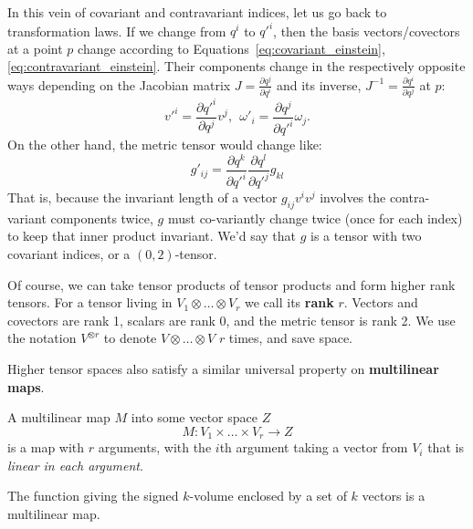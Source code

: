 \documentclass[../master.tex]{subfiles}
\begin{document}
	In this vein of covariant and contravariant indices, let us go back to transformation laws. If we change from $q^i$ to $q'^i$, then the basis vectors/covectors at a point $p$ change according to Equations~\eqref{eq:covariant_einstein},\eqref{eq:contravariant_einstein}. Their components change in the respectively opposite ways depending on the Jacobian matrix $J = \frac{\partial q^j}{\partial q^i}$ and its inverse, $J^{-1} = \frac{\partial q^i}{\partial q^j}$ at $p$:
	\begin{equation}
		v'^i = \frac{\partial q'^i}{\partial q^j} v^j, ~~ \omega'_i = \frac{\partial q^j}{\partial q'^i} \omega_j.
	\end{equation}
	On the other hand, the metric tensor would change like:
	\begin{equation}
		g'_{ij} = \frac{\partial q^k}{\partial q'^i} \frac{\partial q^l}{\partial q'^j} g_{kl}
	\end{equation}
	That is, because the invariant length of a vector $g_{ij} v^i v^j$ involves the contra-variant components twice, $g$ must co-variantly change twice (once for each index) to keep that inner product invariant. We'd say that $g$ is a tensor with two covariant indices, or a $(0,2)$-tensor. 
	
	Of course, we can take tensor products of tensor products and form higher rank tensors. For a tensor living in $V_1 \otimes \dots \otimes V_r$ we call its \textbf{rank} $r$. Vectors and covectors are rank 1, scalars are rank 0, and the metric tensor is rank 2. We use the notation $V^{\otimes r}$ to denote $V \otimes \dots \otimes V$ $r$ times, and save space.
	
	Higher tensor spaces also satisfy a similar universal property on \textbf{multilinear maps}.
	\begin{defn}
		A multilinear map $M$ into some vector space $Z$
		\begin{equation}
			M: V_1 \times \dots \times V_r \rightarrow Z 
		\end{equation}
		is a map with $r$ arguments, with the $i$th argument taking a vector from $V_i$ that is \emph{linear in each argument}. 
	\end{defn}
	
	
	\begin{example}
		The function giving the signed $k$-volume enclosed by a set of $k$ vectors is a multilinear map. 
	\end{example}
	
\end{document}
